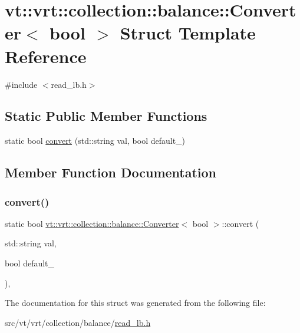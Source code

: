 \hypertarget{structvt_1_1vrt_1_1collection_1_1balance_1_1_converter_3_01bool_01_4}{}\section{vt\+:\+:vrt\+:\+:collection\+:\+:balance\+:\+:Converter$<$ bool $>$ Struct Template Reference}
\label{structvt_1_1vrt_1_1collection_1_1balance_1_1_converter_3_01bool_01_4}


{\ttfamily \#include $<$read\+\_\+lb.\+h$>$}

\subsection*{Static Public Member Functions}
\begin{DoxyCompactItemize}
\item 
static bool \hyperlink{structvt_1_1vrt_1_1collection_1_1balance_1_1_converter_3_01bool_01_4_a37060c9cc732078e45d034bfe868b689}{convert} (std\+::string val, bool default\+\_\+)
\end{DoxyCompactItemize}


\subsection{Member Function Documentation}
\mbox{\label{structvt_1_1vrt_1_1collection_1_1balance_1_1_converter_3_01bool_01_4_a37060c9cc732078e45d034bfe868b689}} 
\subsubsection{\texorpdfstring{convert()}{convert()}}
{\footnotesize\ttfamily static bool \hyperlink{structvt_1_1vrt_1_1collection_1_1balance_1_1_converter}{vt\+::vrt\+::collection\+::balance\+::\+Converter}$<$ bool $>$\+::convert (\begin{DoxyParamCaption}\item[{std\+::string}]{val,  }\item[{bool}]{default\+\_\+ }\end{DoxyParamCaption})\hspace{0.3cm}{\ttfamily [inline]}, {\ttfamily [static]}}



The documentation for this struct was generated from the following file\+:\begin{DoxyCompactItemize}
\item 
src/vt/vrt/collection/balance/\hyperlink{read__lb_8h}{read\+\_\+lb.\+h}\end{DoxyCompactItemize}
